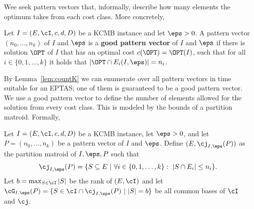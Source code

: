 Wee seek pattern vectors that, informally, describe how many elements the optimum takes from each cost class. More concretely, \begin{definition}
	\label{def:good}
 Let $I =  (E,\cI,c,d,D)$ be a KCMB instance and let $\eps>0$. A pattern vector $(n_0, \ldots, n_k)$ of $I$ and $\eps$ is a {\bf good pattern vector} of $I$ and $\eps$ if there is solution $\OPT$ of $I$ that has an optimal cost $c(\OPT) = \OPT(I)$, such that for all $i \in \{0,1,\ldots,k\}$ it holds that $|\OPT \cap E_i(I,\eps)| = n_i$.	
\end{definition} 
By Lemma~\ref{lem:countK} we can enumerate over all pattern vectors in time suitable for an EPTAS; one of them is guaranteed to be a good pattern vector.  %
We use a good pattern vector to define the number of elements allowed for the solution from every cost class. This is modeled by the bounds of a partition matroid.  %
Formally,

\begin{definition}
	\label{def:partitionMatroid}
	  Let $I =  (E,\cI,c,d,D)$ be a KCMB instance, let $\eps>0$, and let $P = (n_0, \ldots, n_k)$ be a pattern vector of $I$ and $\eps$. Define $(E,\cj_{I,\eps}(P))$ as the partition matroid of $I,\eps,P$ such that \begin{equation}
		\label{eq:J}
		\cj_{I,\eps}(P) = \{S \subseteq E~|~\forall i \in \{0,1,\ldots,k\}:~|S \cap E_i| \leq n_i\}. 
	\end{equation} Let $b = \max_{S \in \cI} |S|$ be the rank of $(E,\cI)$ and let $\cG_{I,\eps}(P) = \{S \in \cI \cap \cj_{I,\eps}(P)~|~|S| = b\}$ be all common bases of $\cI$ and $\cj$. 
\end{definition}







